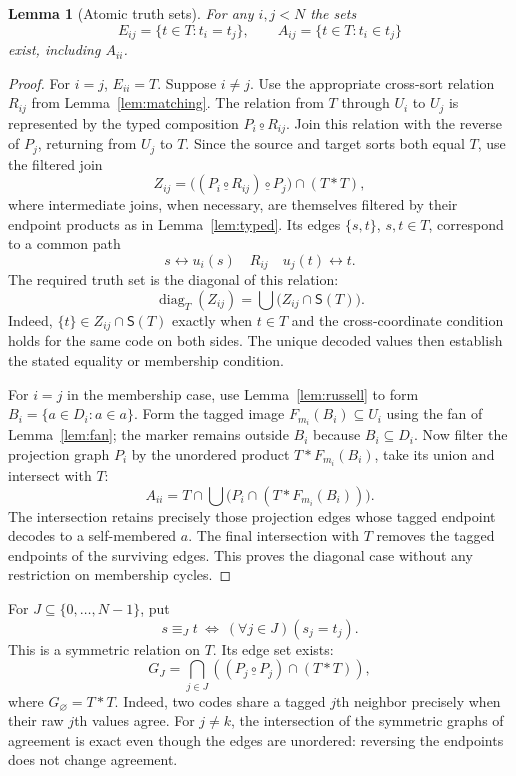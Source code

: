 \documentclass[11pt,a4paper]{article}
\numberwithin{equation}{section}
\newtheorem{lemma}[theorem]{Lemma}
\newcommand{\up}[2]{\{#1,#2\}}
\newcommand{\Comp}{\mathbin{\underline{\circ}}}
\newcommand{\UnProd}{\mathbin{\ast}}
\newcommand{\SI}{\mathsf{S}}
\begin{document}
\begin{lemma}[Atomic truth sets]\label{lem:atomic}
For any $i,j<N$ the sets
\[
E_{ij}=\{t\in T:t_i=t_j\},\qquad
A_{ij}=\{t\in T:t_i\in t_j\}
\]
exist, including $A_{ii}$.
\end{lemma}
\begin{proof}
For $i=j$, $E_{ii}=T$.  Suppose $i\ne j$.  Use the appropriate cross-sort relation $R_{ij}$ from Lemma~\ref{lem:matching}.  The relation from $T$ through $U_i$ to $U_j$ is represented by the typed composition $P_i\Comp R_{ij}$.  Join this relation with the reverse of $P_j$, returning from $U_j$ to $T$.  Since the source and target sorts both equal $T$, use the filtered join
\[
Z_{ij}=\bigl((P_i\Comp R_{ij})\Comp P_j\bigr)\cap(T\UnProd T),
\]
where intermediate joins, when necessary, are themselves filtered by their endpoint products as in Lemma~\ref{lem:typed}.  Its edges $\up st$, $s,t\in T$, correspond to a common path
\[
s\longleftrightarrow u_i(s)\quad R_{ij}\quad u_j(t)\longleftrightarrow t.
\]
The required truth set is the diagonal of this relation:
\begin{equation}\label{eq:diag}
\operatorname{diag}_T(Z_{ij})
=\bigcup\bigl(Z_{ij}\cap\SI(T)\bigr).
\end{equation}
Indeed, $\{t\}\in Z_{ij}\cap\SI(T)$ exactly when $t\in T$ and the cross-coordinate condition holds for the same code on both sides.  The unique decoded values then establish the stated equality or membership condition.

For $i=j$ in the membership case, use Lemma~\ref{lem:russell} to form $B_i=\{a\in D_i:a\in a\}$.  Form the tagged image $F_{m_i}(B_i)\subseteq U_i$ using the fan of Lemma~\ref{lem:fan}; the marker remains outside $B_i$ because $B_i\subseteq D_i$.  Now filter the projection graph $P_i$ by the unordered product $T\UnProd F_{m_i}(B_i)$, take its union and intersect with $T$:
\begin{equation}\label{eq:diag-member}
A_{ii}=T\cap\bigcup\bigl(P_i\cap(T\UnProd F_{m_i}(B_i))\bigr).
\end{equation}
The intersection retains precisely those projection edges whose tagged endpoint decodes to a self-membered $a$.  The final intersection with $T$ removes the tagged endpoints of the surviving edges.  This proves the diagonal case without any restriction on membership cycles.
\end{proof}

For $J\subseteq\{0,\ldots,N-1\}$, put
\[
s\equiv_J t\ \Longleftrightarrow\ (\forall j\in J)(s_j=t_j).
\]
This is a symmetric relation on $T$.  Its edge set exists:
\begin{equation}\label{eq:agreement}
G_J=\bigcap_{j\in J}\left((P_j\Comp P_j)\cap(T\UnProd T)\right),
\end{equation}
where $G_\varnothing=T\UnProd T$.  Indeed, two codes share a tagged $j$th neighbor precisely when their raw $j$th values agree.  For $j\ne k$, the intersection of the symmetric graphs of agreement is exact even though the edges are unordered: reversing the endpoints does not change agreement.
\end{document}
